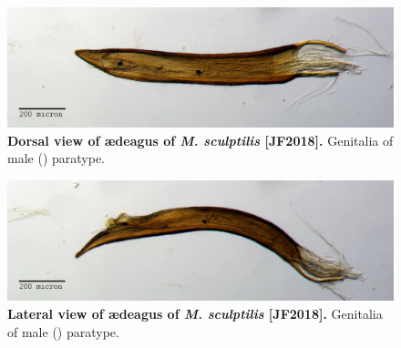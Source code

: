 \documentclass[fleqn,10pt,lineno]{wlpeerj} %
\begin{document}
\begin{figure}[h]
	\centering
	\begin{sideways}
		\includegraphics[width=0.95\textheight]{sculptilis_aedeagus_dorsal.jpg}
	\end{sideways}
	\caption{\textbf{Dorsal view of {\ae}deagus of \textit{M. sculptilis} [JF2018].} Genitalia of male (\male) paratype.}
	\label{fig:sculptilis_aedeagus_dorsal}
\end{figure}

\begin{figure}[h]
	\centering
	\begin{sideways}
		\includegraphics[width=0.95\textheight]{sculptilis_aedeagus_lateral.jpg}
	\end{sideways}
	\caption{\textbf{Lateral view of {\ae}deagus of \textit{M. sculptilis} [JF2018].} Genitalia of male (\male) paratype.}
	\label{fig:sculptilis_aedeagus_lateral}
\end{figure}
\end{document}
